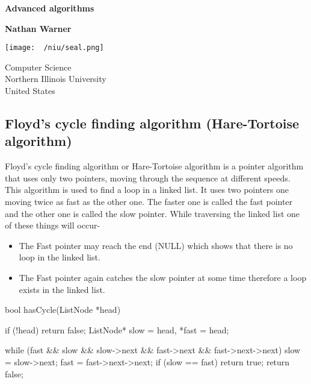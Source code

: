\documentclass{report}
\title{\Huge{}}
\author{\huge{Nathan Warner}}
\date{\huge{}}
\begin{document}
        \begin{titlepage}
       \begin{center}
           \vspace*{1cm}
    
           \textbf{Advanced algorithms}
    
           \vspace{0.5cm}
            
                
           \vspace{1.5cm}
    
           \textbf{Nathan Warner}
    
           \vfill
                
                
           \vspace{0.8cm}
         
           \texttt{[image: ~/niu/seal.png]}
                
           Computer Science \\
           Northern Illinois University\\
           United States\\
           
                
       \end{center}
    \end{titlepage}
    \tableofcontents
    \pagebreak 
    \bigbreak \noindent 
    \subsection{Floyd's cycle finding algorithm (Hare-Tortoise algorithm)}
    \bigbreak \noindent 
    Floyd’s cycle finding algorithm or Hare-Tortoise algorithm is a pointer algorithm that uses only two pointers, moving through the sequence at different speeds. This algorithm is used to find a loop in a linked list. It uses two pointers one moving twice as fast as the other one. The faster one is called the fast pointer and the other one is called the slow pointer.
    \bigbreak \noindent 
    While traversing the linked list one of these things will occur-
    \begin{itemize}
        \item The Fast pointer may reach the end (NULL) which shows that there is no loop in the linked list.
        \item The Fast pointer again catches the slow pointer at some time therefore a loop exists in the linked list.
    \end{itemize}
    \bigbreak \noindent 
    \begin{cppcode}
        bool hasCycle(ListNode *head) {
            if (!head) return false;
            ListNode* slow = head, *fast = head;

            while (fast && slow && slow->next && fast->next && fast->next->next) {
                slow = slow->next;
                fast = fast->next->next;
                if (slow == fast) return true;
            }
            return false;
        }
    \end{cppcode}
    \bigbreak \noindent 
\end{document}
